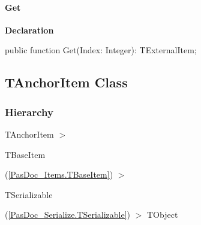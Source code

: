 \documentclass{report}
\newif\ifpdf
\begin{document}
\paragraph*{Get}\hspace*{\fill}

\label{PasDoc_Items.TExternalItemList-Get}
\begin{list}{}{
\setlength{\itemindent}{0cm}
\setlength{\listparindent}{0cm}
\setlength{\leftmargin}{\evensidemargin}
\addtolength{\leftmargin}{\tmplength}
\settowidth{\labelsep}{X}
\addtolength{\leftmargin}{\labelsep}
\setlength{\labelwidth}{\tmplength}
}
\item[\textbf{Declaration}\hfill]
\ifpdf
\begin{flushleft}
\fi
\begin{ttfamily}
public function Get(Index: Integer): TExternalItem;\end{ttfamily}

\ifpdf
\end{flushleft}
\fi

\end{list}
\ifpdf
\subsection*{\large{\textbf{TAnchorItem Class}}\normalsize\hspace{1ex}\hrulefill}
\else
\subsection*{TAnchorItem Class}
\fi
\label{PasDoc_Items.TAnchorItem}
\subsubsection*{\large{\textbf{Hierarchy}}\normalsize\hspace{1ex}\hfill}
TAnchorItem {$>$} \begin{ttfamily}TBaseItem\end{ttfamily}(\ref{PasDoc_Items.TBaseItem}) {$>$} \begin{ttfamily}TSerializable\end{ttfamily}(\ref{PasDoc_Serialize.TSerializable}) {$>$} 
TObject
\end{document}
